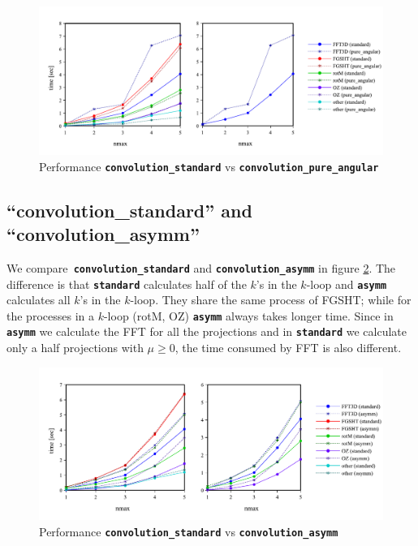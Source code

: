 \begin{figure}[H]
\begin{centering}
\includegraphics[bb=20bp 20bp 667bp 268bp,width=1\columnwidth]{_figure/results/pure_angular}
\par\end{centering}
\caption[Performance comparison of ``convolution\_standard'' and ``convolution\_pure\_angular'']{Performance \texttt{\textbf{convolution\_standard}} vs \texttt{\textbf{convolution\_pure\_angular\label{fig:comparison-pure_angular}}}}
\end{figure}


\subsection{``convolution\_standard'' and ``convolution\_asymm''}

We compare\texttt{\textbf{ convolution\_standard}} and \texttt{\textbf{convolution\_asymm}}
in figure \ref{fig:comparison-asymm}. The difference is that \texttt{\textbf{standard}}
calculates half of the $k$'s in the $k$-loop and \texttt{\textbf{asymm}}
calculates all $k$'s in the $k$-loop. They share the same process
of \acs{FGSHT}; while for the processes in a $k$-loop (rotM, OZ)
\texttt{\textbf{asymm}} always takes longer time. Since in \texttt{\textbf{asymm}}
we calculate the \acs{FFT} for all the projections and in \texttt{\textbf{standard}}
we calculate only a half projections with $\mu\geq0$, the time consumed
by \acs{FFT} is also different.

\begin{figure}[H]
\begin{centering}
\includegraphics[bb=20bp 20bp 647bp 268bp,width=1\columnwidth]{_figure/results/asymm}
\par\end{centering}
\caption[Performance comparison of ``convolution\_standard'' and ``convolution\_asymm'']{Performance \texttt{\textbf{convolution\_standard}} vs \texttt{\textbf{convolution\_asymm\label{fig:comparison-asymm}}}}
\end{figure}


